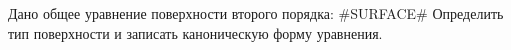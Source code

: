 Дано общее уравнение поверхности второго порядка:
#SURFACE#
Определить тип поверхности и записать каноническую форму уравнения.